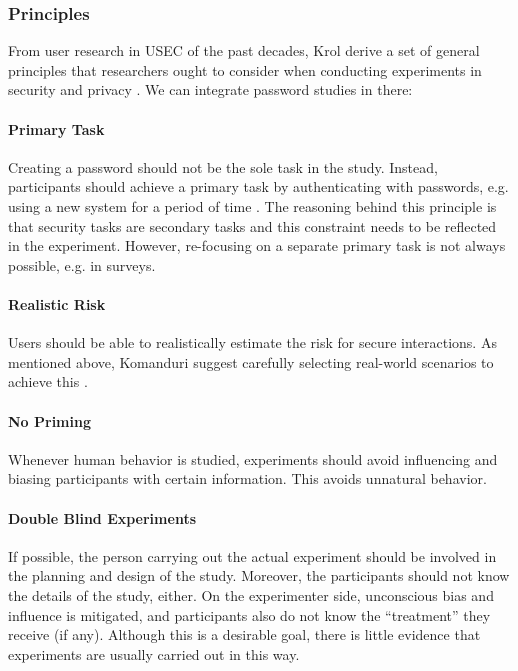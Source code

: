\subsubsection{Principles}\label{sec:rw:principles-experiments}
From user research in \acrshort{USEC} of the past decades, Krol \etal derive a set of general principles that researchers ought to consider when conducting experiments in security and privacy \cite{Krol2016ExperimentDesign}. We can integrate password studies in there:
\paragraph{Primary Task} Creating a password should not be the sole task in the study. Instead, participants should achieve a primary task by authenticating with passwords, e.g. using a new system for a period of time \cite{Brostoff2000PassfacesEvaluation}. The reasoning behind this principle is that security tasks are secondary tasks and this constraint needs to be reflected in the experiment. However, re-focusing on a separate primary task is not always possible, e.g. in surveys. 
\vspace*{-0.5cm}
\paragraph{Realistic Risk} Users should be able to realistically estimate the risk for secure interactions. As mentioned above, Komanduri \etal suggest carefully selecting real-world scenarios to achieve this \cite{Komanduri2011OfPasswordsAndPeople}.
\vspace*{-0.5cm}
\paragraph{No Priming} Whenever human behavior is studied, experiments should avoid influencing and biasing participants with certain information. This avoids unnatural behavior.  
\vspace*{-0.5cm}
\paragraph{Double Blind Experiments} If possible, the person carrying out the actual experiment should be involved in the planning and design of the study. Moreover, the participants should not know the details of the study, either. On the experimenter side, unconscious bias and influence is mitigated, and participants also do not know the ``treatment'' they receive (if any). Although this is a desirable goal, there is little evidence that experiments are usually carried out in this way. 
\vspace*{-0.5cm}
